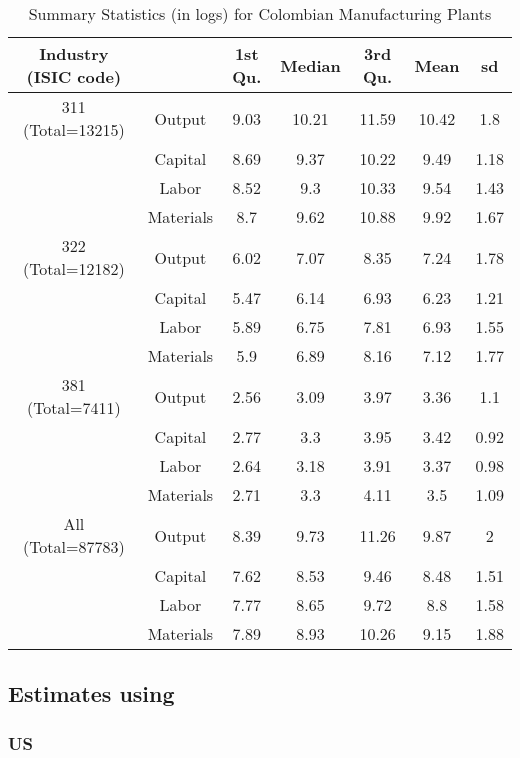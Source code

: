 \documentclass[11pt]{article}
\begin{document}
\begin{table}[H]
\centering
\caption{Summary Statistics (in logs) for Colombian Manufacturing Plants}
\begin{tabular}{ccccccc}
  \hline\hline Industry (ISIC code) &   & 1st Qu. & Median & 3rd Qu. & Mean & sd \\ 
  \hline
311 (Total=13215) & Output & 9.03 & 10.21 & 11.59 & 10.42 & 1.8 \\ 
   & Capital & 8.69 & 9.37 & 10.22 & 9.49 & 1.18 \\ 
   & Labor & 8.52 & 9.3 & 10.33 & 9.54 & 1.43 \\ 
   & Materials & 8.7 & 9.62 & 10.88 & 9.92 & 1.67 \\ 
  322 (Total=12182) & Output & 6.02 & 7.07 & 8.35 & 7.24 & 1.78 \\ 
   & Capital & 5.47 & 6.14 & 6.93 & 6.23 & 1.21 \\ 
   & Labor & 5.89 & 6.75 & 7.81 & 6.93 & 1.55 \\ 
   & Materials & 5.9 & 6.89 & 8.16 & 7.12 & 1.77 \\ 
  381 (Total=7411) & Output & 2.56 & 3.09 & 3.97 & 3.36 & 1.1 \\ 
   & Capital & 2.77 & 3.3 & 3.95 & 3.42 & 0.92 \\ 
   & Labor & 2.64 & 3.18 & 3.91 & 3.37 & 0.98 \\ 
   & Materials & 2.71 & 3.3 & 4.11 & 3.5 & 1.09 \\ 
  All (Total=87783) & Output & 8.39 & 9.73 & 11.26 & 9.87 & 2 \\ 
   & Capital & 7.62 & 8.53 & 9.46 & 8.48 & 1.51 \\ 
   & Labor & 7.77 & 8.65 & 9.72 & 8.8 & 1.58 \\ 
   & Materials & 7.89 & 8.93 & 10.26 & 9.15 & 1.88 \\ 
   \hline
\end{tabular}
\label{COLsum}
\end{table}

\subsection{Estimates using \cite{Levinsohn2003}}

\subsubsection{US}
\end{document}
